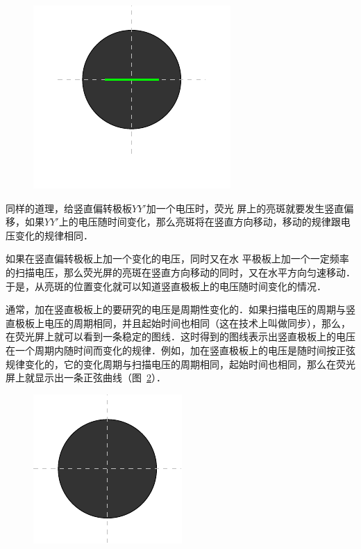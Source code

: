 \begin{figure}[htbp]
    \begin{minipage}[b]{0.48\textwidth}
        \centering
        \includegraphics{fig/B/8-16.pdf}
        \caption{}\label{fig_B_8-16}
    \end{minipage}
\end{figure}

同样的道理，给竖直偏转极板$YY'$加一个电压时，荧光
屏上的亮斑就要发生竖直偏移，如果$YY'$上的电压随时间变化，那么亮斑将在竖直方向移动，移动的规律跟电压变化的规律相同．

如果在竖直偏转极板上加一个变化的电压，同时又在水
平极板上加一个一定频率的扫描电压，那么荧光屏的亮斑在竖直方向移动的同时，又在水平方向匀速移动．于是，从亮斑的位置变化就可以知道竖直极板上的电压随时间变化的情况．

通常，加在竖直极板上的要研究的电压是周期性变化的．如果扫描电压的周期与竖直极板上电压的周期相同，并且起始时间也相同（这在技术上叫做同步），那么，在荧光屏上就可以看到一条稳定的图线．这时得到的图线表示出竖直极板上的电压在一个周期内随时间而变化的规律．例如，加在竖直极板上的电压是随时间按正弦规律变化的，它的变化周期与扫描电压的周期相同，起始时间也相同，那么在荧光屏上就显示出一条正弦曲线（图~\ref{fig_B_8-17}）．
\begin{figure}[htbp]
    \centering
    \includegraphics{fig/B/8-17.pdf}
    \caption{}\label{fig_B_8-17}
\end{figure}

